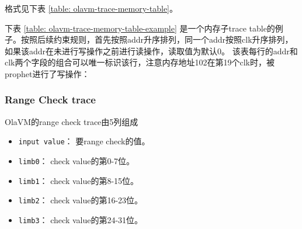 格式见下表 \ref{table: olavm-trace-memory-table}。

\begin{table}[!ht]
    \centering {}
    \caption{OlaVM的trace表结构}
    \label{table: olavm-trace-memory-table}
\end{table}

下表 \ref{table: olavm-trace-memory-table-example} 是一个内存子trace table的例子。按照后续约束规则，首先按照addr升序排列，同一个addr按照clk升序排列，如果该addr在未进行写操作之前进行读操作，读取值为默认0。
该表每行的addr和clk两个字段的组合可以唯一标识该行，注意内存地址102在第19个clk时，被prophet进行了写操作：

\begin{table}[!ht]
    \centering {}
    \caption{OlaVM的memory trace表例子}
    \label{table: olavm-trace-memory-table-example}
\end{table}

\subsubsection{Range Check trace}\label{subsubsec: olavm-trace-range-check}
OlaVM的range check trace由5列组成
\begin{itemize}
    \item \verb|input value|： 要range check的值。
    \item \verb|limb0|： check value的第0-7位。
    \item \verb|limb1|： check value的第8-15位。
    \item \verb|limb2|： check value的第16-23位。
    \item \verb|limb3|： check value的第24-31位。
\end{itemize}

